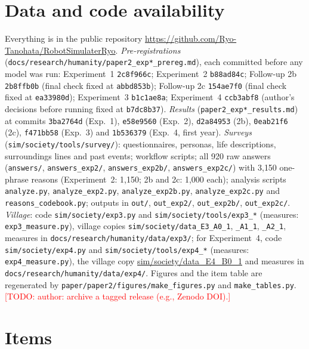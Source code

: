 \documentclass[11pt]{article}
\newcommand{\todo}[1]{\textcolor{red}{[TODO: #1]}}
\begin{document}
\section{Data and code availability}
Everything is in the public repository \url{https://github.com/Ryo-Tanohata/RobotSimulaterRyo}. \emph{Pre-registrations} (\texttt{docs/research/humanity/paper2\_exp*\_prereg.md}), each committed before any model was run: Experiment~1 \texttt{2c8f966c}; Experiment~2 \texttt{b88ad84c}; Follow-up 2b \texttt{2b8ffb0b} (final check fixed at \texttt{abbd853b}); Follow-up 2c \texttt{154ae7f0} (final check fixed at \texttt{ea33980d}); Experiment~3 \texttt{b1c1ae8a}; Experiment~4 \texttt{ccb3abf8} (author's decisions before running fixed at \texttt{b7dc8b37}). \emph{Results} (\texttt{paper2\_exp*\_results.md}) at commits \texttt{3ba2764d} (Exp.~1), \texttt{e58e9560} (Exp.~2), \texttt{d2a84953} (2b), \texttt{0eab21f6} (2c), \texttt{f471bb58} (Exp.~3) and \texttt{1b536379} (Exp.~4, first year). \emph{Surveys} (\texttt{sim/society/tools/survey/}): questionnaires, personas, life descriptions, surroundings lines and past events; workflow scripts; all 920 raw answers (\texttt{answers/}, \texttt{answers\_exp2/}, \texttt{answers\_exp2b/}, \texttt{answers\_exp2c/}) with 3{,}150 one-phrase reasons (Experiment~2: 1{,}150; 2b and 2c: 1{,}000 each); analysis scripts \texttt{analyze.py}, \texttt{analyze\_exp2.py}, \texttt{analyze\_exp2b.py}, \texttt{analyze\_exp2c.py} and \texttt{reasons\_codebook.py}; outputs in \texttt{out/}, \texttt{out\_exp2/}, \texttt{out\_exp2b/}, \texttt{out\_exp2c/}. \emph{Village}: code \texttt{sim/society/exp3.py} and \texttt{sim/society/tools/exp3\_*} (measures: \texttt{exp3\_measure.py}), village copies \texttt{sim/society/data\_E3\_A0\_1}, \texttt{\_A1\_1}, \texttt{\_A2\_1}, measures in \texttt{docs/research/humanity/data/exp3/}; for Experiment~4, code \texttt{sim/society/exp4.py} and \texttt{sim/society/tools/exp4\_*} (measures: \texttt{exp4\_measure.py}), the village copy \url{sim/society/data_E4_B0_1} and measures in \texttt{docs/research/humanity/data/exp4/}. Figures and the item table are regenerated by \texttt{paper/paper2/figures/make\_figures.py} and \texttt{make\_tables.py}. \todo{author: archive a tagged release (e.g., Zenodo DOI).}




\clearpage
\appendix
\section{Items}
{\small

}
\end{document}
